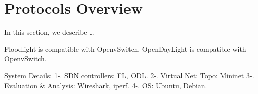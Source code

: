 \chapter{Protocols Overview}\label{ch:protocols} %
In this section, we describe \dots




Floodlight is compatible with OpenvSwitch.
OpenDayLight is compatible with OpenvSwitch.

\cite{Mininet}


System Details:
1-. SDN controllers: FL, ODL.
2-. Virtual Net: Topo: Mininet
3-. Evaluation & Analysis: Wireshark, iperf.
4-. OS: Ubuntu, Debian.
\bigskip
\bigskip
\bigskip




\bigskip
\bigskip
\bigskip




\bigskip
\bigskip
\bigskip







